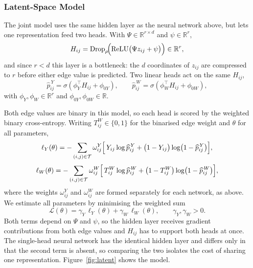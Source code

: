 




\subsubsection{Latent-Space Model}

The joint model uses the same hidden layer as the neural network above, but lets one representation feed
two heads. With \(\Psi\in\mathbb{R}^{r\times d}\) and \(\psi\in\mathbb{R}^{r}\),
\begin{equation}\label{eq:trunk}
 H_{ij}=\mathrm{Drop}_{\rho}\!\Bigl(\mathrm{ReLU}\bigl(\Psi z_{ij}+\psi\bigr)\Bigr)\in\mathbb{R}^{r},
\end{equation}
and since \(r<d\) this layer is a bottleneck: the \(d\) coordinates of \(z_{ij}\) are compressed to \(r\)
before either edge value is predicted. Two linear heads act on the same \(H_{ij}\),
\begin{equation}\label{eq:heads}
 \widehat p^{\,Y}_{ij}=\sigma\!\left(\phi_{Y}^{\top}H_{ij}+\phi_{0Y}\right),
 \qquad
 \widehat p^{\,W}_{ij}=\sigma\!\left(\phi_{W}^{\top}H_{ij}+\phi_{0W}\right),
\end{equation}
with \(\phi_{Y},\phi_{W}\in\mathbb{R}^{r}\) and \(\phi_{0Y},\phi_{0W}\in\mathbb{R}\).

Both edge values are binary in this model, so each head is scored by the weighted binary cross-entropy.
Writing \(T^{W}_{ij}\in\{0,1\}\) for the binarised edge weight and \(\theta\) for all parameters,
\begin{equation}\label{eq:bceY}
 \ell_{Y}(\theta)=-\sum_{(i,j)\in\mathcal{T}}\omega^{Y}_{ij}
 \Bigl[\,Y_{ij}\log\widehat p^{\,Y}_{ij}
 +\bigl(1-Y_{ij}\bigr)\log\bigl(1-\widehat p^{\,Y}_{ij}\bigr)\Bigr],
\end{equation}
\begin{equation}\label{eq:bceW}
 \ell_{W}(\theta)=-\sum_{(i,j)\in\mathcal{T}}\omega^{W}_{ij}
 \Bigl[\,T^{W}_{ij}\log\widehat p^{\,W}_{ij}
 +\bigl(1-T^{W}_{ij}\bigr)\log\bigl(1-\widehat p^{\,W}_{ij}\bigr)\Bigr],
\end{equation}
where the weights \(\omega^{Y}_{ij}\) and \(\omega^{W}_{ij}\) are formed separately for each network, as
above. We estimate all parameters by minimising the weighted sum
\begin{equation}\label{eq:joint}
 \mathcal{L}(\theta)=\gamma_{Y}\,\ell_{Y}(\theta)+\gamma_{W}\,\ell_{W}(\theta),
 \qquad \gamma_{Y},\gamma_{W}>0.
\end{equation}
Both terms depend on \(\Psi\) and \(\psi\), so the hidden layer receives gradient contributions from both
edge values and \(H_{ij}\) has to support both heads at once. The single-head neural network has the identical
hidden layer and differs only in that the second term is absent, so comparing the two isolates the cost of
sharing one representation. Figure~\ref{fig:latent} shows the model.


